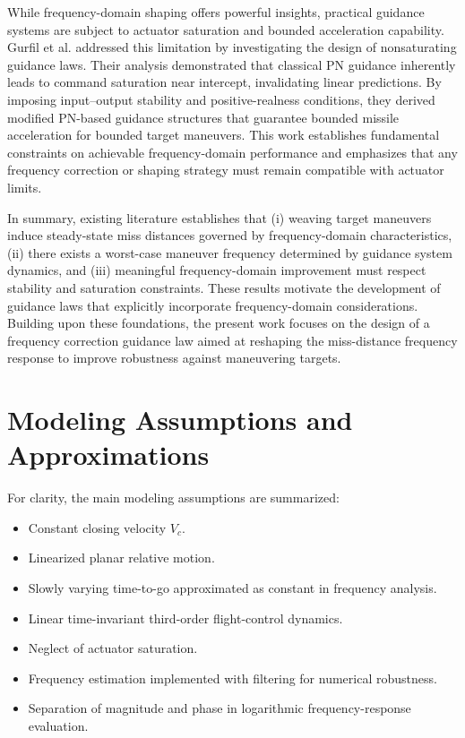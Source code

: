 \documentclass[11pt,a4paper]{article}
\begin{document}
While frequency-domain shaping offers powerful insights, practical guidance systems are subject to actuator saturation and bounded acceleration capability. Gurfil et al.\cite{Gurfil2000} addressed this limitation by investigating the design of nonsaturating guidance laws. Their analysis demonstrated that classical PN guidance inherently leads to command saturation near intercept, invalidating linear predictions. By imposing input--output stability and positive-realness conditions, they derived modified PN-based guidance structures that guarantee bounded missile acceleration for bounded target maneuvers. This work establishes fundamental constraints on achievable frequency-domain performance and emphasizes that any frequency correction or shaping strategy must remain compatible with actuator limits.

In summary, existing literature establishes that (i) weaving target maneuvers induce steady-state miss distances governed by frequency-domain characteristics, (ii) there exists a worst-case maneuver frequency determined by guidance system dynamics, and (iii) meaningful frequency-domain improvement must respect stability and saturation constraints. These results motivate the development of guidance laws that explicitly incorporate frequency-domain considerations. Building upon these foundations, the present work focuses on the design of a frequency correction guidance law aimed at reshaping the miss-distance frequency response to improve robustness against maneuvering targets.

\section{Modeling Assumptions and Approximations}
For clarity, the main modeling assumptions are summarized:
\begin{itemize}[leftmargin=2em]
\item Constant closing velocity $V_c$.
\item Linearized planar relative motion.
\item Slowly varying time-to-go approximated as constant in frequency analysis.
\item Linear time-invariant third-order flight-control dynamics.
\item Neglect of actuator saturation.
\item Frequency estimation implemented with filtering for numerical robustness.
\item Separation of magnitude and phase in logarithmic frequency-response evaluation.
\end{itemize}
\end{document}
